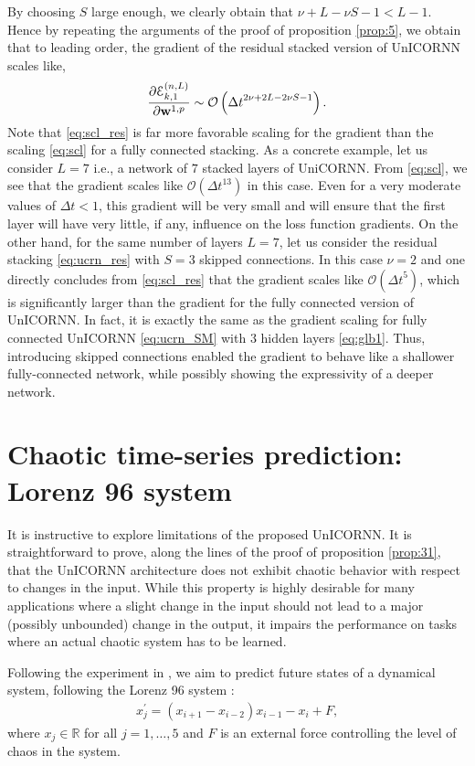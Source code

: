 \documentclass{article}
\newcommand{\bw}{{\bf w}}
\newcommand{\ord}{{\mathcal O}}
\newcommand{\Dt}{{\Delta t}}
\newcommand{\E}{\EuScript{E}}
\begin{document}
By choosing $S$ large enough, we clearly obtain that $\nu+L-\nu S-1 < L-1$. Hence by repeating the arguments of the proof of proposition \ref{prop:5}, we obtain that to leading order, the gradient of the residual stacked version of UnICORNN scales like,
\begin{equation}
\label{eq:scl_res}
\frac{\partial \E^{(n,L)}_{k,1}}{\partial \bw^{1,p}} \sim \ord\left(\Dt^{2\nu + 2L - 2\nu S -1}\right).
\end{equation}
Note that \eqref{eq:scl_res} is far more favorable scaling for the gradient than the scaling \eqref{eq:scl} for a fully connected stacking. As a concrete example, let us consider $L=7$ i.e., a network of $7$ stacked layers of UniCORNN. From \eqref{eq:scl}, we see that the gradient scales like $\ord(\Dt^{13})$ in this case. Even for a very moderate values of $\Dt < 1$, this gradient will be very small and will ensure that the first layer will have very little, if any, influence on the loss function gradients. On the other hand, for the same number of layers $L=7$, let us consider the residual stacking \eqref{eq:ucrn_res} with $S=3$ skipped connections. In this case $\nu=2$ and one directly concludes from \eqref{eq:scl_res} that the gradient scales like $\ord(\Dt^5)$, which is significantly larger than the gradient for the fully connected version of UnICORNN. In fact, it is exactly the same as the gradient scaling for fully connected UnICORNN \eqref{eq:ucrn_SM} with $3$ hidden layers \eqref{eq:glb1}. Thus, introducing skipped connections enabled the gradient to behave like a shallower fully-connected network, while possibly showing the expressivity of a deeper network.  


\section{Chaotic time-series prediction: Lorenz 96 system}
It is instructive to explore limitations of the proposed UnICORNN. It is straightforward to prove, along the lines of the proof of proposition \ref{prop:31}, that the UnICORNN architecture does not exhibit chaotic behavior with respect to changes in the input. While this property is highly desirable for many applications where a slight change in the input should not lead to a major (possibly unbounded) change in the output, it impairs the performance on tasks where an actual chaotic system has to be learned.

Following the experiment in \cite{coRNN}, we aim to predict future states of a dynamical system, following the Lorenz 96 system \citep{lorenz96}:
\begin{align}
\label{eq:lorenz}
    x^\prime_j = (x_{i+1} - x_{i-2})x_{i-1} - x_i + F,
\end{align}
where $x_j\in \mathbb{R}$ for all $j=1,\dots,5$ and $F$ is an external force controlling the level of chaos in the system. 
\end{document}
